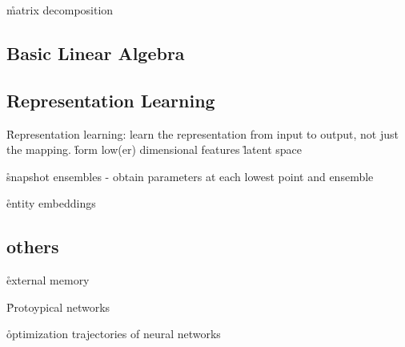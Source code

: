 \r{matrix decomposition}

\subsection{Basic Linear Algebra}


\subsection{Representation Learning}

\r{Representation learning: learn the representation from input to output, not just the mapping.}
\r{form low(er) dimensional features}
\r{latent space}


\r{snapshot ensembles \cite{huang2017snapshot} - obtain parameters at each lowest point and ensemble}


\r{entity embeddings \cite{guo2016entity}}

\subsection{others}

\r{external memory \cite{santoro2016meta, garnelo2018conditional, munkhdalai2017meta}}


\r{Protoypical networks \cite{snell2017prototypical}}






\r{optimization trajectories of neural networks  }




